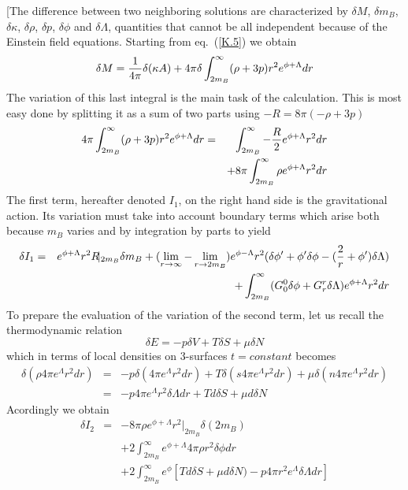 \documentclass[12pt,oneside]{report}
\def\gd {\delta}
\def\gL {\Lambda}
\begin{document}
[The difference between two neighboring solutions are
characterized by $\gd M$, $\gd m_B$, $\gd \kappa$, $\gd
\rho$, $\gd p$, $\gd \phi$ and $\gd \gL$, quantities that
cannot be all independent because of the Einstein field
equations. Starting from eq.~(\ref{K.5}) we obtain
\begin{equation}
\gd M = {1 \over 4 \pi} \gd ( \kappa A) +
4 \pi \gd \int_{2 m_B}^\infty
(\rho + 3 p) r^2 e^{\phi + \gL} dr
\label{par01}
\end{equation}
The variation of this last integral is the main task of the
calculation. This is most easy done by splitting it as a
sum of two parts  using $-R = 8 \pi (-\rho +
3p)$
\begin{eqnarray}
4 \pi 
 \int_{2 m_B}^\infty
(\rho + 3 p) r^2 e^{\phi + \gL} dr
&=&  \int_{2 m_B}^\infty - {R \over 2} e^{\phi + \gL} r^2 dr
\nonumber\\
&\ &+ 8 \pi  \int_{2 m_B}^\infty \rho e^{\phi + \gL} r^2 dr
\label{par02}
\end{eqnarray}
The first term, hereafter denoted $I_1$, on the right hand
side is the gravitational action. Its variation must take
into account boundary terms which arise both because $m_B$
varies and by integration by parts to yield
\begin{eqnarray}
\gd I_1 &=& e^{\phi + \gL} r^2 R\!\vert_{2 m_B} \gd m_B +
(\lim_{r\to\infty} -\lim_{r\to 2m_B})
e^{\phi - \gL} r^2 ( \gd \phi^\prime + \phi^\prime \gd \phi -
({2 \over r} + \phi^\prime)\delta\gL )\nonumber\\
&\ &+ \int_{2m_B}^\infty (G^0_0 \gd \phi + G^r_r \gd \gL )
e^{\phi + \gL} r^2 dr
\label{par03}
\end{eqnarray}
To prepare the evaluation of the variation of the second
term, let us recall the  thermodynamic relation
\begin{equation}
\gd E = -p\gd V + T \gd S + \mu \gd N
\label{par04}
\end{equation}
which in terms of local densities on 3-surfaces $t=constant$
becomes
\begin{eqnarray}
\gd ( \rho 4 \pi e^{\gL} r^2 dr) &=&
-p \gd (  4 \pi e^{\gL} r^2 dr) 
+ T \gd ( s 4 \pi e^{\gL} r^2 dr)
+ \mu \gd ( n 4 \pi e^{\gL} r^2 dr)\nonumber\\
&=&- p 4 \pi e^\gL r^2 \gd \gL dr + T d\gd S + \mu d \gd N
\label{par05}
\end{eqnarray}
Acordingly we obtain
\begin{eqnarray}
\gd I_2 &=& - 8 \pi \rho e^{\phi + \gL} r^2 \vert_{2 m_B} \gd
(2 m_B)
\nonumber\\
& &+2 \int_{2m_B}^\infty e^{\phi + \gL} 4 \pi \rho r^2 \gd
\phi dr\nonumber\\
& &+ 2 \int_{2m_B}^\infty e^{\phi } \left[ T d \gd S +
\mu d \gd N) - p 4 \pi r^2 e^{\gL}\gd \gL dr\right]
\label{par06}
\end{eqnarray}
\end{document}
